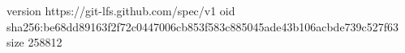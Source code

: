 version https://git-lfs.github.com/spec/v1
oid sha256:be68dd89163f2f72c0447006cb853f583c885045ade43b106acbde739c527f63
size 258812
